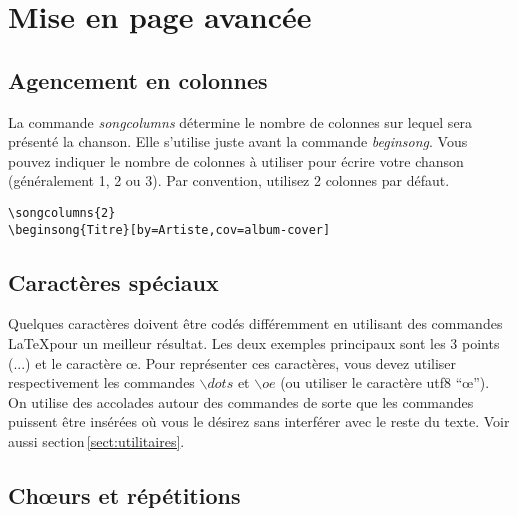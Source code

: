 \documentclass[a4paper]{article}
\begin{document}
\section{Mise en page avancée}

\subsection{Agencement en colonnes}

La commande \emph{songcolumns} détermine le nombre de colonnes sur
lequel sera présenté la chanson. Elle s'utilise juste avant la
commande \emph{beginsong}. Vous pouvez indiquer le nombre de colonnes
à utiliser pour écrire votre chanson (généralement 1, 2 ou 3). Par
convention, utilisez 2 colonnes par défaut.

\begin{verbatim}
\songcolumns{2}
\beginsong{Titre}[by=Artiste,cov=album-cover]
\end{verbatim}

\subsection{Caractères spéciaux}

Quelques caractères doivent être codés différemment en utilisant des
commandes \LaTeX pour un meilleur résultat. Les deux exemples
principaux sont les 3 points (...) et le caractère \oe{}. Pour
représenter ces caractères, vous devez utiliser respectivement les
commandes ${\backslash dots}$ et ${\backslash oe}$ (ou utiliser le
caractère utf8 ``œ''). On utilise des accolades autour des commandes de
sorte que les commandes puissent être insérées où vous le désirez sans
interférer avec le reste du texte. Voir aussi
section\,\ref{sect:utilitaires}.

\subsection{Ch\oe{}urs et répétitions}
\end{document}
